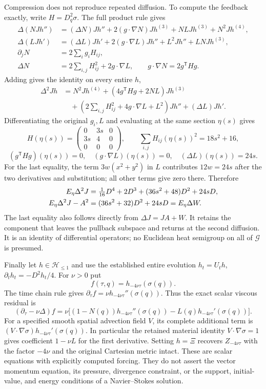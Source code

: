 Compression does not reproduce repeated diffusion. To compute the
feedback exactly, write $H=D_q^2\sigma$. The full product rule gives
\begin{align*}
 \Delta(NJh'')&=(\Delta N)Jh''+
 2(g\cdot\nabla N)Jh^{(3)}+NLJh^{(3)}+N^2Jh^{(4)},\\
 \Delta(LJh')&=(\Delta L)Jh'+
 2(g\cdot\nabla L)Jh''+L^2Jh''+LNJh^{(3)},\\
 \partial_jN&=2\sum_i g_iH_{ij},\\
 \Delta N&=2\sum_{i,j}H_{ij}^2+2g\cdot\nabla L,\qquad
 g\cdot\nabla N=2g^{\mathsf T}Hg.
\end{align*}
Adding gives the identity on every entire $h$,
\begin{align*}
 \Delta^2Jh
 &=N^2Jh^{(4)}
 +(4g^{\mathsf T}Hg+2NL)Jh^{(3)}\\
 &\quad+(2\sum_{i,j}H_{ij}^2+4g\cdot\nabla L+L^2)Jh''
 +(\Delta L)Jh'.
\end{align*}
Differentiating the original $g_i,L$ and evaluating at the same section
$\eta(s)$ gives
\[
 H(\eta(s))=
 \begin{pmatrix}0&3s&0\\3s&4&0\\0&0&0\end{pmatrix},\qquad
 \sum_{i,j}H_{ij}(\eta(s))^2=18s^2+16,
\]
\[
 (g^{\mathsf T}Hg)(\eta(s))=0,\quad
 (g\cdot\nabla L)(\eta(s))=0,\quad
 (\Delta L)(\eta(s))=24s .
\]
For the last equality, the term $3w(x^2+y^2)$ in $L$ contributes
$12w=24s$ after the two derivatives and substitution; all other terms
give zero there. Therefore
\begin{align}
 E_\eta\Delta^2J
 &=\tfrac1{16}D^4+2D^3+(36s^2+48)D^2+24sD,\notag\\
 E_\eta\Delta^2J-A^2
 &=(36s^2+32)D^2+24sD=E_\eta\Delta W .
 \label{eq:cq-spatial-second-feedback}
\end{align}
The last equality also follows directly from $\Delta J=JA+W$.
It retains the component that leaves the pullback subspace and returns
at the second diffusion. It is an identity of differential operators;
no Euclidean heat semigroup on all of $\mathscr G$ is presumed.

Finally let $h\in\mathcal H_{\le1}$ and use the established entire
evolution $h_t=U_th$, $\partial_th_t=-D^2h_t/4$. For $\nu>0$ put
\[
 f(\tau,q)=h_{-4\nu\tau}(\sigma(q)).
\]
The time chain rule gives
$\partial_\tau f=\nu h_{-4\nu\tau}''(\sigma(q))$.
Thus the exact scalar viscous residual is
\begin{equation}
 (\partial_\tau-\nu\Delta)f
 =\nu\bigl[(1-N(q))h_{-4\nu\tau}''(\sigma(q))
          -L(q)h_{-4\nu\tau}'(\sigma(q))\bigr].
 \label{eq:cq-spatial-viscous-residual}
\end{equation}
For a specified smooth spatial advection field $V$, its complete
additional term is
$(V\cdot\nabla\sigma)h_{-4\nu\tau}'(\sigma(q))$.
In particular the retained material identity $V\cdot\nabla\sigma=1$
gives coefficient $1-\nu L$ for the first derivative.
Setting $h=\Xi$ recovers $Z_{-4\nu\tau}$ with the factor $-4\nu$
and the original Cartesian metric intact. These are scalar equations
with explicitly computed forcing. They do not assert the vector
momentum equation, its pressure, divergence constraint, or the support,
initial-value, and energy conditions of a Navier--Stokes solution.
